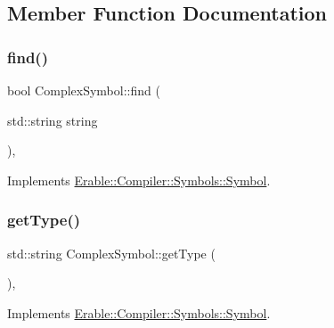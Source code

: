 \subsection{Member Function Documentation}
\mbox{\label{class_erable_1_1_compiler_1_1_symbols_1_1_complex_symbol_a0b1517a55182a14119c73b4c58192dde}} 
\subsubsection{\texorpdfstring{find()}{find()}}
{\footnotesize\ttfamily bool Complex\+Symbol\+::find (\begin{DoxyParamCaption}\item[{std\+::string}]{string }\end{DoxyParamCaption})\hspace{0.3cm}{\ttfamily [override]}, {\ttfamily [virtual]}}



Implements \mbox{\hyperlink{class_erable_1_1_compiler_1_1_symbols_1_1_symbol_ac1d8b1392aef2e93bd47520a86f8617f}{Erable\+::\+Compiler\+::\+Symbols\+::\+Symbol}}.

\mbox{\label{class_erable_1_1_compiler_1_1_symbols_1_1_complex_symbol_a868025e3a718e2ae6226a89403859b3a}} 
\subsubsection{\texorpdfstring{getType()}{getType()}}
{\footnotesize\ttfamily std\+::string Complex\+Symbol\+::get\+Type (\begin{DoxyParamCaption}{ }\end{DoxyParamCaption})\hspace{0.3cm}{\ttfamily [override]}, {\ttfamily [virtual]}}



Implements \mbox{\hyperlink{class_erable_1_1_compiler_1_1_symbols_1_1_symbol_a781d595ec8d14efcdbbf6d6123af1f50}{Erable\+::\+Compiler\+::\+Symbols\+::\+Symbol}}.


